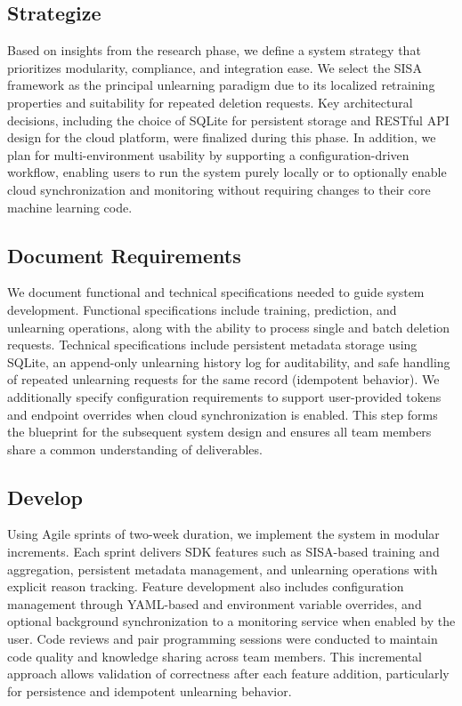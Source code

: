 \subsection{Strategize}
Based on insights from the research phase, we define a system strategy that prioritizes modularity, compliance, and integration ease. We select the SISA framework \cite{bourtoule2021machine} as the principal unlearning paradigm due to its localized retraining properties and suitability for repeated deletion requests. Key architectural decisions, including the choice of SQLite for persistent storage and RESTful API design for the cloud platform, were finalized during this phase. In addition, we plan for multi-environment usability by supporting a configuration-driven workflow, enabling users to run the system purely locally or to optionally enable cloud synchronization and monitoring without requiring changes to their core machine learning code.

\subsection{Document Requirements}
We document functional and technical specifications needed to guide system development. Functional specifications include training, prediction, and unlearning operations, along with the ability to process single and batch deletion requests. Technical specifications include persistent metadata storage using SQLite, an append-only unlearning history log for auditability, and safe handling of repeated unlearning requests for the same record (idempotent behavior). We additionally specify configuration requirements to support user-provided tokens and endpoint overrides when cloud synchronization is enabled. This step forms the blueprint for the subsequent system design and ensures all team members share a common understanding of deliverables.

\subsection{Develop}
Using Agile sprints of two-week duration, we implement the system in modular increments. Each sprint delivers SDK features such as SISA-based training and aggregation, persistent metadata management, and unlearning operations with explicit reason tracking. Feature development also includes configuration management through YAML-based and environment variable overrides, and optional background synchronization to a monitoring service when enabled by the user. Code reviews and pair programming sessions were conducted to maintain code quality and knowledge sharing across team members. This incremental approach allows validation of correctness after each feature addition, particularly for persistence and idempotent unlearning behavior.

